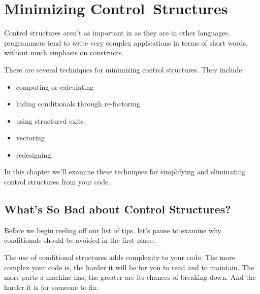 

\chapter{Minimizing Control~Structures}%
%

\initial Control structures aren't as important in \Forth{} as they
are in other languages. \Forth{} programmers tend to write very
complex applications in terms of short words, without much emphasis on
 constructs.

There are several techniques for minimizing control structures.
They include:

\begin{itemize}
\item computing or calculating
\item hiding conditionals through re-factoring
\item using structured exits
\item vectoring
\item redesigning.
\end{itemize}
In this chapter we'll examine these techniques for simplifying and
eliminating control structures from your code.

\section{What's So Bad about Control Structures?}%

Before we begin reeling off our list of tips, let's pause to examine why
conditionals should be avoided in the first place.

The use of conditional structures adds complexity to your code. The
more complex your code is, the harder it will be for you to read and to
maintain. The more parts a machine has, the greater are its chances of
breaking down. And the harder it is for someone to fix.

